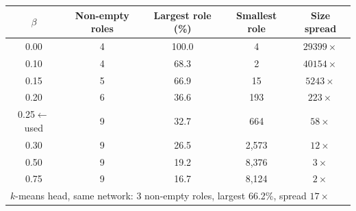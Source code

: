 \caption{\textbf{Selecting the strength of the prototype marginal constraint.} The constraint of unbalanced optimal transport is present only to stop the prototype head from collapsing, so we fix $\beta$ at the weakest value that keeps all nine prototypes occupied. The criterion uses no address labels. Below $\beta=0.25$ prototypes are left empty; above it the roles are driven towards equal size, which a heavy-tailed transfer network has no reason to obey. Values are for the Aid for Ukraine TRON network (117,621 addresses, $K=9$, training seed 42); the transition occurs in the same place on the primary network.}
\label{tab:balance}
\begin{tabular}{ccccc}
\toprule
$\beta$ & Non-empty roles & Largest role (\%) & Smallest role & Size spread \\
\midrule
0.00 & 4 & 100.0 & 4 & $29399\times$ \\
0.10 & 4 & 68.3 & 2 & $40154\times$ \\
0.15 & 5 & 66.9 & 15 & $5243\times$ \\
0.20 & 6 & 36.6 & 193 & $223\times$ \\
0.25\;$\leftarrow$ used & 9 & 32.7 & 664 & $58\times$ \\
0.30 & 9 & 26.5 & 2,573 & $12\times$ \\
0.50 & 9 & 19.2 & 8,376 & $3\times$ \\
0.75 & 9 & 16.7 & 8,124 & $2\times$ \\
\midrule
\multicolumn{5}{l}{\footnotesize $k$-means head, same network: 3 non-empty roles, largest 66.2\%, spread $17\times$} \\
\bottomrule
\end{tabular}
